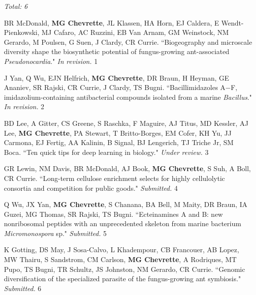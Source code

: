 \begin{cvpubs}

\cvpub
{\hspace{-1cm} \textit{Total: 6}} %
{}

\cvpub
{BR McDonald, \textbf{MG Chevrette}, JL Klassen, HA Horn, EJ Caldera, E Wendt-Pienkowski, MJ Cafaro, AC Ruzzini, EB Van Arnam, GM Weinstock, NM Gerardo, M Poulsen, G Suen, J Clardy, CR Currie. ``Biogeography and microscale diversity shape the biosynthetic potential of fungus-growing ant-associated \textit{Pseudonocardia}." \textit{In revision. \textbf{}}}
{1}

\cvpub
{J Yan, Q Wu, EJN Helfrich, \textbf{MG Chevrette}, DR Braun, H Heyman,  GE Ananiev, SR Rajski, CR Currie, J Clardy, TS Bugni. ``Bacillimidazoles A−F, imidazolium-containing antibacterial compounds isolated from a marine \textit{Bacillus}." \textit{In revision.}}
{2}

\cvpub
{BD Lee, A Gitter, CS Greene, S Raschka, F Maguire, AJ Titus, MD Kessler, AJ Lee, \textbf{MG Chevrette}, PA Stewart, T Britto-Borges, EM Cofer, KH Yu, JJ Carmona, EJ Fertig, AA Kalinin, B Signal, BJ Lengerich, TJ Triche Jr, SM Boca. ``Ten quick tips for deep learning in biology." \textit{Under review. \textbf{}}}
{3}

\cvpub
{GR Lewin, NM Davis, BR McDonald, AJ Book, \textbf{MG Chevrette}, S Suh, A Boll, CR Currie. ``Long-term cellulose enrichment selects for highly cellulolytic consortia and competition for public goods." \textit{Submitted. \textbf{}}}
{4}

\cvpub
{Q Wu, JX Yan, \textbf{MG Chevrette}, S Chanana, BA Bell, M Maity, DR Braun, IA Guzei, MG Thomas, SR Rajski, TS Bugni. ``Ecteinamines A and B: new nonribosomal peptides with an unprecedented skeleton from marine bacterium \textit{Micromonospora} sp." \textit{Submitted.}}
{5}

\cvpub
{K Gotting, DS May, J Sosa-Calvo, L Khadempour, CB Francouer, AB Lopez, MW Thairu, S Sandstrom, CM Carlson, \textbf{MG Chevrette}, A Rodriques, MT Pupo, TS Bugni, TR Schultz, JS Johnston, NM Gerardo, CR Currie. ``Genomic diversification of the specialized parasite of the fungus-growing ant symbiosis." \textit{Submitted.}}
{6}

\end{cvpubs}